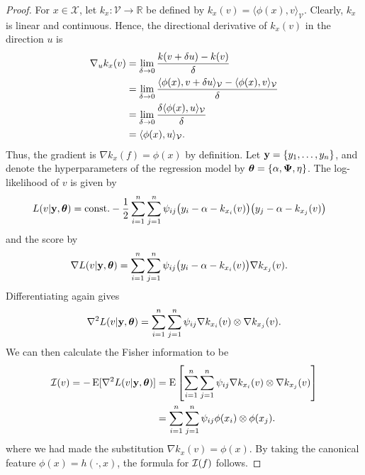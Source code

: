 \documentclass[a4paper,showframe,11pt,draft]{report}
\begin{document}
\begin{proof}
	For $x \in \mathcal X$, let $k_x:\mathcal V \rightarrow \mathbb R$ be defined by $k_x(v) = \langle \phi(x), v \rangle_{\mathcal V}$. 
	Clearly, $k_x$ is linear and continuous.
	Hence, the directional derivative of $k_x(v)$ in the direction $u$ is
	\begin{align*}
		\nabla_u k_x(v)	
		&= \lim_{\delta \rightarrow 0} \frac{k(v+\delta u) - k(v)}{\delta} \\
		&= \lim_{\delta \rightarrow 0} \frac{\langle \phi(x), v+\delta u \rangle_{{\mathcal V}} - \langle \phi(x), v \rangle_{{\mathcal V}}}{\delta} \\
		&= \lim_{\delta \rightarrow 0} \frac{\delta\langle \phi(x), u \rangle_{{\mathcal V}}}{\delta} \\
		&= \langle \phi(x), u \rangle_{{\mathcal V}}.
	\end{align*}
	Thus, the gradient is $\nabla k_x(f) = \phi(x)$ by definition. 
	Let ${\mathbf y} = \{y_1,\dots,y_n\}$, and denote the hyperparameters of the regression model by ${\bm\theta} = \{ \alpha,{\bm\Psi},\eta \}$.
	The log-likelihood of $v$ is given by
	\begin{align*}
		L(v|{\mathbf y},{\bm\theta}) 
		&= \text{const.} - \frac{1}{2} \sum_{i=1}^n\sum_{j=1}^n \psi_{ij}\big(y_i - \alpha - k_{x_i}(v)\big)\big(y_j - \alpha - k_{x_j}(v)\big)
	\end{align*}
	and the score by
	\begin{align*}
		\nabla L(v|{\mathbf y},{\bm\theta})
		&= \sum_{i=1}^n\sum_{j=1}^n \psi_{ij}\big(y_i - \alpha - k_{x_i}(v)\big)\nabla k_{x_j}(v).
	\end{align*}
	Differentiating again gives
	\[
	  \nabla^2 L(v|{\mathbf y},{\bm\theta}) = \sum_{i=1}^n\sum_{j=1}^n \psi_{ij} \nabla k_{x_i}(v) \otimes \nabla k_{x_j}(v).
	\]
	We can then calculate the Fisher information to be
	\begin{align*}
		{\mathcal I}(v) = -\operatorname{E}[\nabla^2 L(v|{\mathbf y},{\bm\theta})] 
		&=\operatorname{E} \left[ \sum_{i=1}^n\sum_{j=1}^n \psi_{ij} \nabla k_{x_i}(v) \otimes \nabla k_{x_j}(v) \right] \\
		&=\sum_{i=1}^n\sum_{j=1}^n \psi_{ij} \phi(x_i) \otimes \phi(x_j).
	\end{align*}	 	
	where we had made the substitution $\nabla k_x(v) = \phi(x)$.
	By taking the canonical feature $\phi(x)=h(\cdot,x)$, the formula for ${\mathcal I}(f)$ follows.
\end{proof}
\end{document}
